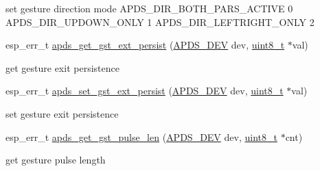\begin{DoxyCompactItemize}
\begin{DoxyCompactList}
\begin{DoxyItemize}
\item set gesture direction mode A\+P\+D\+S\+\_\+\+D\+I\+R\+\_\+\+B\+O\+T\+H\+\_\+\+P\+A\+R\+S\+\_\+\+A\+C\+T\+I\+VE 0 A\+P\+D\+S\+\_\+\+D\+I\+R\+\_\+\+U\+P\+D\+O\+W\+N\+\_\+\+O\+N\+LY 1 A\+P\+D\+S\+\_\+\+D\+I\+R\+\_\+\+L\+E\+F\+T\+R\+I\+G\+H\+T\+\_\+\+O\+N\+LY 2 
\end{DoxyItemize}\end{DoxyCompactList}\item 
esp\+\_\+err\+\_\+t \hyperlink{group__APDS9960__GestureFunctions_gab18d83431aa818c8afdac98abbbd4bcd}{apds\+\_\+get\+\_\+gst\+\_\+ext\+\_\+persist} (\hyperlink{structAPDS9960__Driver}{A\+P\+D\+S\+\_\+\+D\+EV} dev, \hyperlink{vl53l0x__types_8h_aba7bc1797add20fe3efdf37ced1182c5}{uint8\+\_\+t} $\ast$val)
\begin{DoxyCompactList}\small\item\em 
\begin{DoxyItemize}
\item get gesture exit persistence 
\end{DoxyItemize}\end{DoxyCompactList}\item 
esp\+\_\+err\+\_\+t \hyperlink{group__APDS9960__GestureFunctions_ga1e2b489514bf8ac82fcf1e9d44d68396}{apds\+\_\+set\+\_\+gst\+\_\+ext\+\_\+persist} (\hyperlink{structAPDS9960__Driver}{A\+P\+D\+S\+\_\+\+D\+EV} dev, \hyperlink{vl53l0x__types_8h_aba7bc1797add20fe3efdf37ced1182c5}{uint8\+\_\+t} $\ast$val)
\begin{DoxyCompactList}\small\item\em 
\begin{DoxyItemize}
\item set gesture exit persistence 
\end{DoxyItemize}\end{DoxyCompactList}\item 
esp\+\_\+err\+\_\+t \hyperlink{group__APDS9960__GestureFunctions_gaeeb9b0cc4c0d99da8959c6a1f1c942d8}{apds\+\_\+get\+\_\+gst\+\_\+pulse\+\_\+len} (\hyperlink{structAPDS9960__Driver}{A\+P\+D\+S\+\_\+\+D\+EV} dev, \hyperlink{vl53l0x__types_8h_aba7bc1797add20fe3efdf37ced1182c5}{uint8\+\_\+t} $\ast$cnt)
\begin{DoxyCompactList}\small\item\em 
\begin{DoxyItemize}
\item get gesture pulse length 
\end{DoxyItemize}\end{DoxyCompactList}\item 

\end{DoxyCompactItemize}
